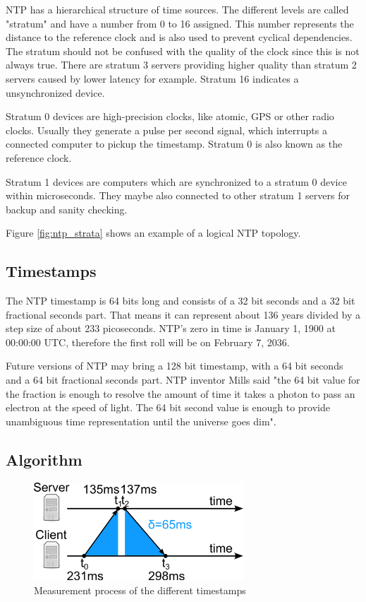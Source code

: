 NTP has a hierarchical structure of time sources. The different levels are called "stratum" and have a number from 0 to 16 assigned. This number represents the distance to the reference clock and is also used to prevent cyclical dependencies. The stratum should not be confused with the quality of the clock since this is not always true. There are stratum 3 servers providing higher quality than stratum 2 servers caused by lower latency for example. Stratum 16 indicates a unsynchronized device.

Stratum 0 devices are high-precision clocks, like atomic, GPS or other radio clocks. Usually they generate a pulse per second signal, which interrupts a connected computer to pickup the timestamp. Stratum 0 is also known as the reference clock.

Stratum 1 devices are computers which are synchronized to a stratum 0 device within microseconds. They maybe also connected to other stratum 1 servers for backup and sanity checking.

Figure \ref{fig:ntp_strata} shows an example of a logical NTP topology.

\subsection{Timestamps}

The NTP timestamp is 64 bits long and consists of a 32 bit seconds and a 32 bit fractional seconds part. That means it can represent about 136 years divided by a step size of about 233 picoseconds. NTP's zero in time is January 1, 1900 at 00:00:00 UTC, therefore the first roll will be on February 7, 2036.

Future versions of NTP may bring a 128 bit timestamp, with a 64 bit seconds and a 64 bit fractional seconds part. NTP inventor Mills said "the 64 bit value for the fraction is enough to resolve the amount of time it takes a photon to pass an electron at the speed of light. The 64 bit second value is enough to provide unambiguous time representation until the universe goes dim".

\subsection{Algorithm}

\begin{figure}[tb]
	\centering
	\includegraphics[width=0.7\textwidth]{figures/ntp_algorithm.png}
	\caption{Measurement process of the different timestamps}
	\label{fig:ntp_algorithm}
\end{figure}

